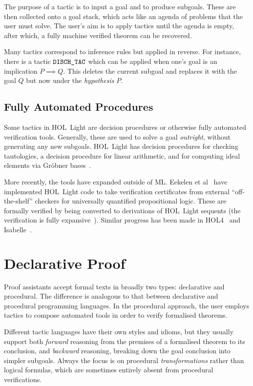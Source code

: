 The purpose of a tactic is to input a goal and to produce subgoals. These are then collected onto a goal stack, which acts like an agenda of problems that the user must solve. The user's aim is to apply tactics until the agenda is empty, after which, a fully machine verified theorem can be recovered.

Many tactics correspond to inference rules but applied in reverse. For instance, there is a tactic $\texttt{DISCH\_TAC}$ which can be applied when one's goal is an implication $P \implies Q$. This deletes the current subgoal and replaces it with the goal $Q$ but now under the \emph{hypothesis} $P$.

\subsection{Fully Automated Procedures}
Some tactics in HOL~Light are decision procedures or otherwise fully automated verification tools. Generally, these are used to solve a goal \emph{outright}, without generating any new subgoals. HOL~Light has decision procedures for checking tautologies, a decision procedure for linear arithmetic, and for computing ideal elements via Gr\"{o}bner bases~\cite{BuchbergerGrobner}.

More recently, the tools have expanded outside of ML. Eekelen et al~\cite{HOLLightBoolean} have implemented HOL~Light code to take verification certificates from external ``off-the-shelf'' checkers for universally quantified propositional logic. These are formally verified by being converted to derivations of HOL~Light sequents (the verification is fully expansive~\cite{FullyExpansive}). Similar progress has been made in HOL4~\cite{HOLBoolean} and Isabelle~\cite{IsabelleSledgehammer}.

\section{Declarative Proof}\label{sec:DeclarativeProof}
Proof assistants accept formal texts in broadly two types: declarative and procedural. The difference is analogous to that between declarative and procedural programming languages. In the procedural approach, the user employs tactics to compose automated tools in order to verify formalised theorems.

Different tactic languages have their own styles and idioms, but they usually support both \emph{forward} reasoning from the premises of a formalised theorem to its conclusion, and \emph{backward} reasoning, breaking down the goal conclusion into simpler subgoals. Always the focus is on procedural \emph{transformations} rather than logical formulas, which are sometimes entirely absent from procedural verifications. 

